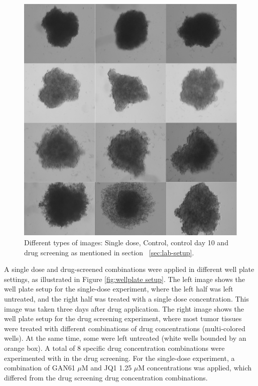 \begin{figure}[H]
  \centering
  \includegraphics[scale=0.4]{figures/types.png} 
  \caption{Different types of images: Single dose, Control, control day 10 and drug screening as mentioned in section ~\ref{sec:lab-setup}.}
  \label{fig:Types}
\end{figure}

A single dose and drug-screened combinations were applied in different well plate settings, as illustrated in Figure \ref{fig:wellplate setup}. The left image shows the well plate setup for the single-dose experiment, where the left half was left untreated, and the right half was treated with a single dose concentration. This image was taken three days after drug application. The right image shows the well plate setup for the drug screening experiment, where most tumor tissues were treated with different combinations of drug concentrations (multi-colored wells). At the same time, some were left untreated (white wells bounded by an orange box). A total of 8 specific drug concentration combinations were experimented with in the drug screening. For the single-dose experiment, a combination of GAN61 \( \mu \text{M} \) and JQ1 1.25 \( \mu \text{M} \) concentrations was applied, which differed from the drug screening drug concentration combinations. 


